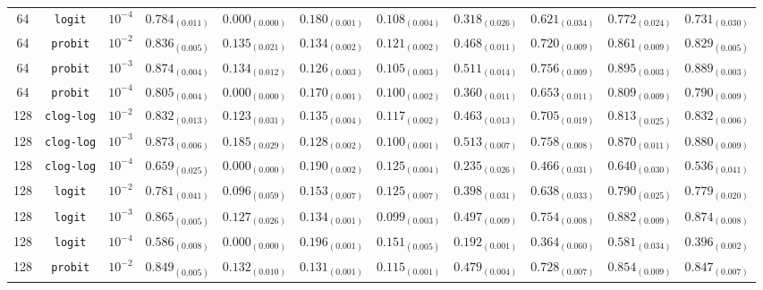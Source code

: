 \documentclass[journal]{IEEEtran}
\begin{document}
\begin{table}[!t]
\begin{tabular}{c@{\hskip 0.15cm}c@{\hskip 0.15cm}c@{\hskip 0.15cm}c@{\hskip 0.30cm}c@{\hskip 0.20cm}c@{\hskip 0.20cm}c@{\hskip 0.20cm}c@{\hskip 0.20cm}c@{\hskip 0.20cm}c@{\hskip 0.20cm}c}
			64 & \texttt{logit} & $10^{-4}$ & $0.784_{(0.011)}$ & $0.000_{(0.000)}$ & $0.180_{(0.001)}$ & $0.108_{(0.004)}$ & $0.318_{(0.026)}$ & $0.621_{(0.034)}$ & $0.772_{(0.024)}$ & $0.731_{(0.030)}$\\
			64 & \texttt{probit} & $10^{-2}$ & $0.836_{(0.005)}$ & $0.135_{(0.021)}$ & $0.134_{(0.002)}$ & $0.121_{(0.002)}$ & $0.468_{(0.011)}$ & $0.720_{(0.009)}$ & $0.861_{(0.009)}$ & $0.829_{(0.005)}$\\
			64 & \texttt{probit} & $10^{-3}$ & $\mathit{0.874_{(0.004)}}$ & $0.134_{(0.012)}$ & $0.126_{(0.003)}$ & $0.105_{(0.003)}$ & $0.511_{(0.014)}$ & $0.756_{(0.009)}$ & $\mathit{0.895_{(0.003)}}$ & $\mathit{0.889_{(0.003)}}$\\
			64 & \texttt{probit} & $10^{-4}$ & $0.805_{(0.004)}$ & $0.000_{(0.000)}$ & $0.170_{(0.001)}$ & $0.100_{(0.002)}$ & $0.360_{(0.011)}$ & $0.653_{(0.011)}$ & $0.809_{(0.009)}$ & $0.790_{(0.009)}$\\
			128 & \texttt{clog-log} & $10^{-2}$ & $0.832_{(0.013)}$ & $0.123_{(0.031)}$ & $0.135_{(0.004)}$ & $0.117_{(0.002)}$ & $0.463_{(0.013)}$ & $0.705_{(0.019)}$ & $0.813_{(0.025)}$ & $0.832_{(0.006)}$\\
			128 & \texttt{clog-log} & $10^{-3}$ & $0.873_{(0.006)}$ & $\mathbf{0.185_{(0.029)}}$ & $0.128_{(0.002)}$ & $0.100_{(0.001)}$ & $0.513_{(0.007)}$ & $0.758_{(0.008)}$ & $0.870_{(0.011)}$ & $0.880_{(0.009)}$\\
			128 & \texttt{clog-log} & $10^{-4}$ & $0.659_{(0.025)}$ & $0.000_{(0.000)}$ & $0.190_{(0.002)}$ & $0.125_{(0.004)}$ & $0.235_{(0.026)}$ & $0.466_{(0.031)}$ & $0.640_{(0.030)}$ & $0.536_{(0.041)}$\\
			128 & \texttt{logit} & $10^{-2}$ & $0.781_{(0.041)}$ & $0.096_{(0.059)}$ & $0.153_{(0.007)}$ & $0.125_{(0.007)}$ & $0.398_{(0.031)}$ & $0.638_{(0.033)}$ & $0.790_{(0.025)}$ & $0.779_{(0.020)}$\\
			128 & \texttt{logit} & $10^{-3}$ & $0.865_{(0.005)}$ & $0.127_{(0.026)}$ & $0.134_{(0.001)}$ & $0.099_{(0.003)}$ & $0.497_{(0.009)}$ & $0.754_{(0.008)}$ & $0.882_{(0.009)}$ & $0.874_{(0.008)}$\\
			128 & \texttt{logit} & $10^{-4}$ & $0.586_{(0.008)}$ & $0.000_{(0.000)}$ & $0.196_{(0.001)}$ & $0.151_{(0.005)}$ & $0.192_{(0.001)}$ & $0.364_{(0.060)}$ & $0.581_{(0.034)}$ & $0.396_{(0.002)}$\\
			128 & \texttt{probit} & $10^{-2}$ & $0.849_{(0.005)}$ & $0.132_{(0.010)}$ & $0.131_{(0.001)}$ & $0.115_{(0.001)}$ & $0.479_{(0.004)}$ & $0.728_{(0.007)}$ & $0.854_{(0.009)}$ & $0.847_{(0.007)}$\\

\end{tabular}
\end{table}
\end{document}

